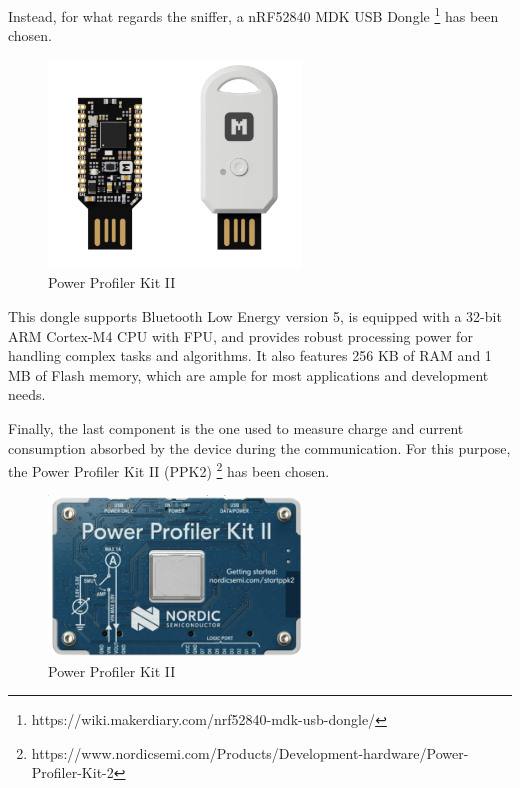 \documentclass{Configuration_Files/PoliMi3i_thesis}
\begin{document}
Instead, for what regards the sniffer, a nRF52840 MDK USB Dongle \footnote{https://wiki.makerdiary.com/nrf52840-mdk-usb-dongle/} has been chosen.

\begin{figure}[H]
    \centering
    \includegraphics[width=0.6\textwidth]{Materials/figure3}
    \caption{Power Profiler Kit II}
\end{figure}

This dongle supports Bluetooth Low Energy version 5, is equipped with a 32-bit ARM Cortex-M4 CPU with FPU, and provides robust processing power for handling complex tasks and algorithms. It also features 256 KB of RAM and 1 MB of Flash memory, which are ample for most applications and development needs.

Finally, the last component is the one used to measure charge and current consumption absorbed by the device during the communication. For this purpose, the Power Profiler Kit II (PPK2) \footnote{https://www.nordicsemi.com/Products/Development-hardware/Power-Profiler-Kit-2} has been chosen.

\begin{figure}[H]
    \centering
    \includegraphics[width=0.6\textwidth]{Materials/figure4}
    \caption{Power Profiler Kit II}
\end{figure}
\end{document}
